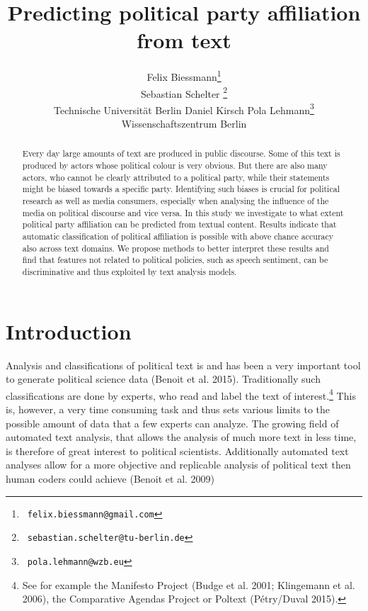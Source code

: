 \documentclass[11pt]{article}
\title{Predicting political party affiliation from text}
\author{Felix Biessmann\thanks{~\tt felix.biessmann@gmail.com}\\
  \And
  Sebastian Schelter \thanks{~\tt sebastian.schelter@tu-berlin.de}\\ Technische Universit\"at Berlin
\And 
Daniel Kirsch
  \And
 Pola Lehmann\thanks{ ~{\tt pola.lehmann@wzb.eu} }\\
  Wissenschaftszentrum Berlin\\
}
\date{}
\begin{document}
\maketitle


\begin{abstract}
Every day large amounts of text are produced in public discourse. Some of this text is produced by actors whose political colour is very obvious. But there are also many actors, who cannot be clearly attributed to a political party, while their statements might be biased towards a specific party. Identifying such biases is crucial for political research as well as media consumers, especially when analysing the influence of the media on political discourse and vice versa. In this study we investigate to what extent political party affiliation can be predicted from textual content. Results indicate that automatic classification of political affiliation is possible with above chance accuracy also across text domains. We propose methods to better interpret these results and find that features not related to political policies, such as speech sentiment, can be discriminative and thus exploited by text analysis models. 
\end{abstract}

\section{Introduction}
\label{sec:intro}
%
Analysis and classifications of political text is and has been a very important tool to generate political science data (Benoit et al. 2015). Traditionally such classifications are done by experts, who read and label the text of interest.\footnote{See for example the Manifesto Project (Budge et al. 2001; Klingemann et al. 2006), the Comparative Agendas Project or Poltext (Pétry/Duval 2015).} This is, however, a very time consuming task and thus sets various limits to the possible amount of data that a few experts can analyze. The growing field of automated text analysis, that allows the analysis of much more text in less time, is therefore of great interest to political scientists. Additionally automated text analyses allow for a more objective and replicable analysis of political text then human coders could achieve (Benoit et al. 2009)
\end{document}
